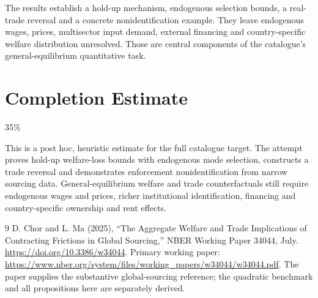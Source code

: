 \documentclass[11pt,a4paper]{article}
\theoremstyle{definition}
\theoremstyle{remark}
\begin{document}
The results establish a hold-up mechanism, endogenous selection bounds, a real-trade reversal and a concrete nonidentification example. They leave endogenous wages, prices, multisector input demand, external financing and country-specific welfare distribution unresolved. Those are central components of the catalogue's general-equilibrium quantitative task.

\section{Completion Estimate}
35\%

This is a post hoc, heuristic estimate for the full catalogue target.
The attempt proves hold-up welfare-loss bounds with endogenous mode selection, constructs a trade reversal and demonstrates enforcement nonidentification from narrow sourcing data. General-equilibrium welfare and trade counterfactuals still require endogenous wages and prices, richer institutional identification, financing and country-specific ownership and rent effects.

\begin{thebibliography}{9}
 D. Chor and L. Ma (2025), ``The Aggregate Welfare and Trade Implications of Contracting Frictions in Global Sourcing,'' NBER Working Paper 34044, July. \url{https://doi.org/10.3386/w34044}. Primary working paper: \url{https://www.nber.org/system/files/working_papers/w34044/w34044.pdf}. The paper supplies the substantive global-sourcing reference; the quadratic benchmark and all propositions here are separately derived.
\end{thebibliography}
\end{document}
